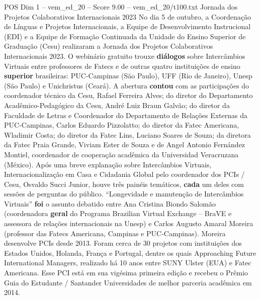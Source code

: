 \begin{textsample}{POS Dim 1 – vem\_ed\_20 – Score 9.00 – vem\_ed\_20/t100.txt}  \label{ex:f1_pos_109}
Jornada dos Projetos Colaborativos Internacionais 2023 No dia 5 de outubro, a Coordenação de Línguas e Projetos Internacionais, a Equipe de Desenvolvimento Instrucional (EDI) e a Equipe de Formação Continuada da Unidade do Ensino Superior de Graduação (Cesu) realizaram a Jornada dos Projetos Colaborativos Internacionais 2023.
O webinário gratuito trouxe \textbf{diálogos} sobre Intercâmbios Virtuais entre professores de Fatecs e de outras quatro instituições de ensino \textbf{superior} brasileiras: PUC-Campinas (São Paulo), UFF (Rio de Janeiro), Unesp (São Paulo) e Unichristus (Ceará).
A abertura \textbf{contou} com as participações do coordenador técnico da Cesu, Rafael Ferreira Alves; do diretor do Departamento Acadêmico-Pedagógico da Cesu, André Luiz Braun Galvão; do diretor da Faculdade de Letras e Coordenador do Departamento de Relações Externas da PUC-Campinas, Carlos Eduardo Pizzolatto; do diretor da Fatec Americana, Wladimir Costa; do diretor da Fatec Lins, Luciano Soares de Souza; da diretora da Fatec Praia Grande, Viviam Ester de Souza e de Angel Antonio Fernández Montiel, coordenador de cooperação acadêmica da Universidad Veracruzana (México).
Após uma breve explanação sobre Intercâmbios Virtuais, Internacionalização em Casa e Cidadania Global pelo coordenador dos PCIs / Cesu, Osvaldo Succi Junior, houve três painéis temáticos, \textbf{cada} um deles com sessões de perguntas do público. “Longevidade e manutenção de Intercâmbios Virtuais” \textbf{foi} o assunto debatido entre Ana Cristina Biondo Salomão (coordenadora \textbf{geral} do Programa Brazilian Virtual Exchange – BraVE e assessora de relações internacionais na Unesp) e Carlos Augusto Amaral Moreira (professor das Fatecs Americana, Campinas e PUC-Campinas).
Moreira desenvolve PCIs desde 2013.
Foram cerca de 30 projetos com instituições dos Estados Unidos, Holanda, França e Portugal, dentre os quais Approaching Future International Managers, realizado há 10 anos entre SUNY Ulster (EUA) e Fatec Americana.
Esse PCI está em sua vigésima primeira edição e recebeu o Prêmio Guia do Estudante / Santander Universidades de melhor parceria acadêmica em 2014.

\end{textsample}
